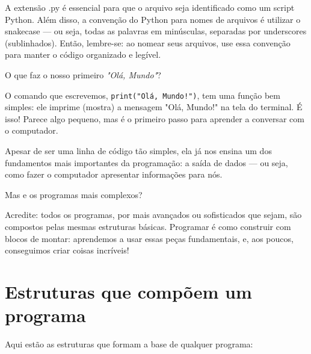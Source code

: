 \documentclass[12pt]{book}
\begin{document}
	\begin{tcolorbox}[colback=gray!10, colframe=black, title={\large\bfseries Importante}]
	A extensão .py é essencial para que o arquivo seja identificado como um script Python. \newline Além disso, a convenção do Python para nomes de arquivos é utilizar o snakecase — ou seja, todas as palavras em minúsculas, separadas por underscores (sublinhados). \newline
	Então, lembre-se: ao nomear seus arquivos, use essa convenção para manter o código organizado e legível.
	\end{tcolorbox}
	
	O que faz o nosso primeiro \textit{"Olá, Mundo"}?
	
	O comando que escrevemos, \texttt{print("Olá, Mundo!")}, tem uma função bem simples: ele imprime (mostra) a mensagem "Olá, Mundo!" na tela do terminal. É isso! Parece algo pequeno, mas é o primeiro passo para aprender a conversar com o computador.
	
	Apesar de ser uma linha de código tão simples, ela já nos ensina um dos fundamentos mais importantes da programação: a saída de dados — ou seja, como fazer o computador apresentar informações para nós.
	
	Mas e os programas mais complexos?
	
	Acredite: todos os programas, por mais avançados ou sofisticados que sejam, são compostos pelas mesmas estruturas básicas. Programar é como construir com blocos de montar: aprendemos a usar essas peças fundamentais, e, aos poucos, conseguimos criar coisas incríveis!
	
	\section{Estruturas que compõem um programa}
	
	Aqui estão as estruturas que formam a base de qualquer programa:
	
\end{document}
